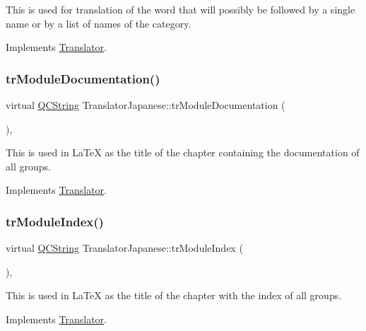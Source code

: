 This is used for translation of the word that will possibly be followed by a single name or by a list of names of the category. 

Implements \mbox{\hyperlink{class_translator}{Translator}}.

\mbox{\label{class_translator_japanese_a4a84703619c7fbf08d815a7e1ed5051b}} 
\subsubsection{\texorpdfstring{trModuleDocumentation()}{trModuleDocumentation()}}
{\footnotesize\ttfamily virtual \mbox{\hyperlink{class_q_c_string}{Q\+C\+String}} Translator\+Japanese\+::tr\+Module\+Documentation (\begin{DoxyParamCaption}{ }\end{DoxyParamCaption})\hspace{0.3cm}{\ttfamily [inline]}, {\ttfamily [virtual]}}

This is used in La\+TeX as the title of the chapter containing the documentation of all groups. 

Implements \mbox{\hyperlink{class_translator}{Translator}}.

\mbox{\label{class_translator_japanese_afc8dced41f60d8ae454847f48c7fc471}} 
\subsubsection{\texorpdfstring{trModuleIndex()}{trModuleIndex()}}
{\footnotesize\ttfamily virtual \mbox{\hyperlink{class_q_c_string}{Q\+C\+String}} Translator\+Japanese\+::tr\+Module\+Index (\begin{DoxyParamCaption}{ }\end{DoxyParamCaption})\hspace{0.3cm}{\ttfamily [inline]}, {\ttfamily [virtual]}}

This is used in La\+TeX as the title of the chapter with the index of all groups. 

Implements \mbox{\hyperlink{class_translator}{Translator}}.

